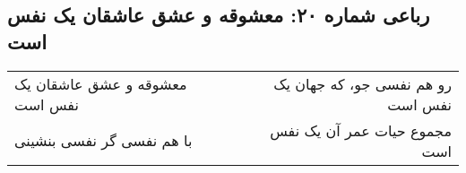 \begin{center}
\section*{رباعی شماره ۲۰: معشوقه و عشق عاشقان یک نفس است}
\label{sec:020}
\begin{longtable}{l p{0.5cm} r}
معشوقه و عشق عاشقان یک نفس است
&&
رو هم نفسی جو، که جهان یک نفس است
\\
با هم نفسی گر نفسی بنشینی
&&
مجموع حیات عمر آن یک نفس است
\\
\end{longtable}
\end{center}
